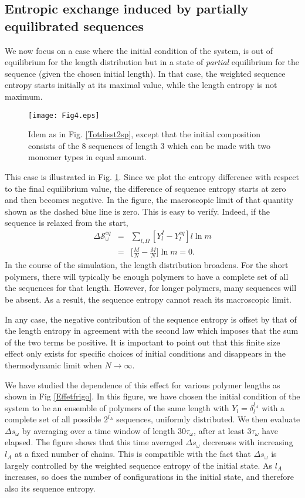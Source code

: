\documentclass[
	amsmath,
	amssymb,
	a4paper,
	aip,		%
	jcp,		%
	reprint, twocolumn  %
	fleqn,
	showpacs,
	floatfix
]{revtex4-1}
\newcommand{\bea}{\begin{eqnarray}}
\newcommand{\eea}{\end{eqnarray}}
\begin{document}
\subsection{Entropic exchange induced by partially equilibrated sequences}

We now focus on a case where the initial condition of the system, is out of equilibrium for the length distribution but 
in a state of {\it partial} equilibrium for the sequence (given the chosen initial length). 
In that case, the weighted sequence entropy starts initially at its maximal value, while the length entropy is not maximum.
\begin{figure}[H]
\centering
\texttt{[image: Fig4.eps]} 
\caption{Idem as in Fig. \ref{Totdisst2sp}, except that the initial composition consists of the 8 sequences of length 3 which 
can be made with two monomer types in equal amount.}
\label{Totdisstmix}
\end{figure}

This case is illustrated in Fig. \ref{Totdisstmix}. Since we  
plot the entropy difference with respect to the final equilibrium value, 
the difference of sequence entropy starts at zero and then becomes negative.
In the figure, the macroscopic limit of that quantity shown as the dashed blue line is zero. 
This is easy to verify. Indeed, if the sequence is relaxed from the start,  
\bea
\Delta  \mathcal{S}^{eq}_{\omega} &=& \sum_{l,\Omega} [Y^{I}_{l} - Y^{eq}_{l}] l \ln m \label{Specent3canc} \\ \nonumber
&=& \bigg[ \frac{M}{N} - \frac{M}{N} \bigg] \ln m = 0.
\eea
In the course of the simulation, the length distribution broadens. For the short polymers, there will typically be enough polymers to 
have a complete set of all the sequences for that length. However, for longer polymers, many sequences will be absent. As a result, 
the sequence entropy cannot reach its macroscopic limit.

In any case, the negative contribution of the sequence entropy is offset by that of the length entropy 
in agreement with the second law which imposes that the sum of the two terms be positive. 
It is important to point out that this finite size effect only exists for specific choices 
of initial conditions and disappears in the thermodynamic limit when $N \rightarrow \infty$. 

We have studied the dependence of this effect for various polymer lengths as shown in Fig \ref{Effetfrigo}. 
In this figure, we have chosen the initial condition of the system to be an ensemble of polymers
of the same length with $Y_l=\delta_l^{l_A}$ with a complete set of all possible $2^{l_A}$ sequences, uniformly distributed.
We then evaluate $\Delta s_{\omega}$ by averaging over a time window of length $30\tau_{\omega}$, after at least $3\tau_{\omega}$ have elapsed.  
The figure shows that this time averaged $\Delta s_{\omega}$ decreases with increasing $l_A$ at a fixed number of chains. This is compatible with 
the fact that $\Delta s_{\omega}$ is largely controlled by the weighted sequence entropy of the initial state. As $l_A$ increases, so does the number of 
configurations in the initial state, and therefore also its sequence entropy.
\end{document}

